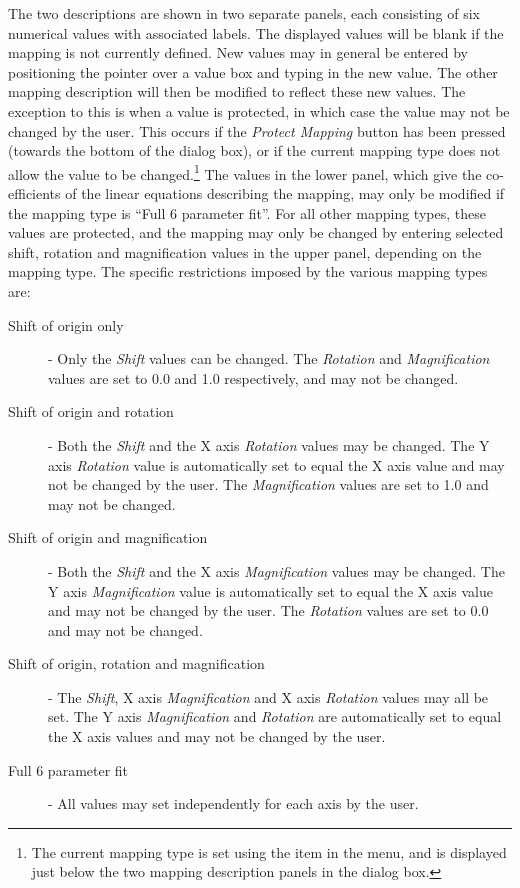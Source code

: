 \documentclass[11pt,nolof]{starlink}
\begin{document}
The two descriptions are shown in two separate panels, each consisting of
six numerical values with associated labels. The displayed values will be
blank if the mapping is not currently defined. New values may in general
be entered by positioning the pointer over a value box and typing in the
new value. The other mapping description will then be modified to reflect
these new values. The exception to this is when a value is protected, in
which case the value may not be changed by the user. This occurs if the
\emph{Protect Mapping} button has been pressed (towards the bottom of the
dialog box), or if the current mapping type does not allow the value to
be changed.\footnote{The current mapping type is set using the  item in the
 menu, and is displayed just
below the two mapping description panels in the dialog box.} The values
in the lower panel, which give the co-efficients of the linear equations
describing the mapping, may only be modified if the mapping type is
``Full 6 parameter fit''. For all other mapping types, these values are
protected, and the mapping may only be changed by entering selected
shift, rotation and magnification values in the upper panel, depending on
the mapping type. The specific restrictions imposed by the various
mapping types are:


\begin{description}

\item[Shift of origin only] - Only the \emph{Shift} values can be changed.
The \emph{Rotation} and \emph{Magnification} values are set to 0.0 and 1.0
respectively, and may not be changed.

\item[Shift of origin and rotation] - Both the \emph{Shift} and the X axis \emph{Rotation} values may be changed. The Y axis \emph{Rotation} value is
automatically set to equal the X axis value and may not be changed by the
user. The \emph{Magnification} values are set to 1.0 and may not be changed.

\item[Shift of origin and magnification] - Both the \emph{Shift} and the X
axis \emph{Magnification} values may be changed. The Y axis \emph{Magnification} value is automatically set to equal the X axis value and
may not be changed by the user. The \emph{Rotation} values are set to 0.0 and
may not be changed.

\item[Shift of origin, rotation and magnification] - The  \emph{Shift},
X axis \emph{Magnification} and X axis \emph{Rotation} values may all be set.
The Y axis \emph{Magnification} and \emph{Rotation} are automatically set
to equal the X axis values and may not be changed by the user.

\item[Full 6 parameter fit] - All values may set independently for each
axis by the user.
\end{description}
\end{document}

